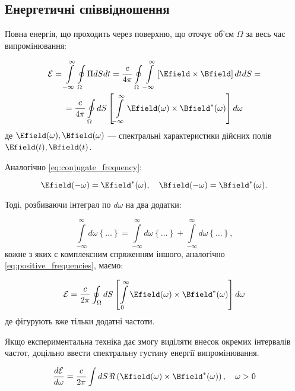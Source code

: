 \subsection*{Енергетичні співвідношення}

Повна енергія, що проходить через поверхню, що оточує об’єм \( \Omega \) за весь час випромінювання:

\begin{multline*}
\mathcal{E} = \int\limits_{-\infty}^{\infty} \oint\limits_{\Omega} \Pi dS dt = \frac{c}{4\pi} \oint\limits_{\Omega} \int\limits_{-\infty}^{\infty}
\left[ \Efield \times \Bfield \right] dtdS = \\
= \frac{c}{4\pi} \oint\limits_{\Omega} dS \left[ \int\limits_{-\infty}^{\infty} \Efield(\omega) \times \Bfield^{*}(\omega) \right] d\omega
\end{multline*}
де \( \Efield(\omega), \Bfield(\omega) \) --- спектральні характеристики дійсних полів \( \Efield(t), \Bfield(t) \).

Аналогічно \eqref{eq:conjugate_frequency}:

\begin{equation*}
\Efield(-\omega) = \Efield^{*}(\omega), \quad \Bfield(-\omega) = \Bfield^{*}(\omega).
\end{equation*}

Тоді, розбиваючи інтеграл по \( d\omega \) на два додатки:

\begin{equation*}
\int\limits_{-\infty}^{\infty} d\omega \left\{ \ldots \right\} = \int\limits_{-\infty}^{\infty} d\omega \left\{ \ldots \right\} +
\int\limits_{-\infty}^{\infty}
d\omega
\left\{ \ldots \right\},
\end{equation*}
кожне з яких є комплексним спряженням іншого, аналогічно \eqref{eq:positive_frequencies}, маємо:

\begin{equation}
\mathcal{E} = \frac{c}{2\pi} \oint_{\Omega} dS \left[ \int\limits_{0}^{\infty} \Efield(\omega) \times \Bfield^{*}(\omega) \right] d\omega
\label{eq:energy_positive_frequencies}
\end{equation}
де фігурують вже тільки додатні частоти.

Якщо експериментальна техніка дає змогу виділяти внесок окремих інтервалів частот, доцільно ввести спектральну густину енергії випромінювання.

\begin{equation}
\frac{d\mathcal{E}}{d\omega} = \frac{c}{2\pi} \int dS \, \Re\left(\Efield(\omega) \times \Bfield^{*}(\omega)\right), \quad \omega > 0
\label{eq:energy_density}
\end{equation}

